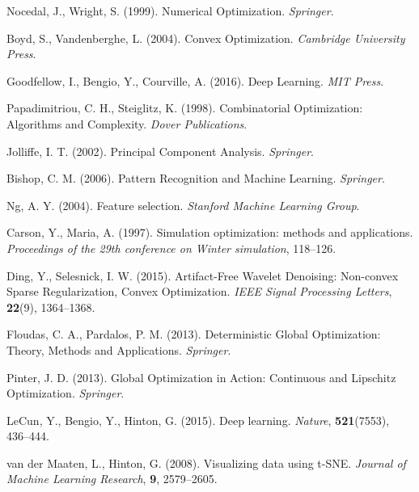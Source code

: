 \begin{itemize}
		\begin{thebibliography}{}
			
			Nocedal, J., Wright, S. (1999). Numerical Optimization.
			\textit{Springer}.
			
			Boyd, S., Vandenberghe, L. (2004). Convex Optimization.
			\textit{Cambridge University Press}.
			
			Goodfellow, I., Bengio, Y., Courville, A. (2016). Deep Learning.
			\textit{MIT Press}.
			
			Papadimitriou, C. H., Steiglitz, K. (1998). Combinatorial Optimization: Algorithms and Complexity.
			\textit{Dover Publications}.
			
			Jolliffe, I. T. (2002). Principal Component Analysis.
			\textit{Springer}.
			
			Bishop, C. M. (2006). Pattern Recognition and Machine Learning.
			\textit{Springer}.
			
			Ng, A. Y. (2004). Feature selection.
			\textit{Stanford Machine Learning Group}.
			
			Carson, Y., Maria, A. (1997). Simulation optimization: methods and applications.
			\textit{Proceedings of the 29th conference on Winter simulation}, 118--126.
			
			Ding, Y., Selesnick, I. W. (2015). Artifact-Free Wavelet Denoising: Non-convex Sparse Regularization, Convex Optimization.
			\textit{IEEE Signal Processing Letters}, \textbf{22}(9), 1364--1368.
			
			Floudas, C. A., Pardalos, P. M. (2013). Deterministic Global Optimization: Theory, Methods and Applications.
			\textit{Springer}.
			
			Pinter, J. D. (2013). Global Optimization in Action: Continuous and Lipschitz Optimization.
			\textit{Springer}.
			
			LeCun, Y., Bengio, Y., Hinton, G. (2015). Deep learning.
			\textit{Nature}, \textbf{521}(7553), 436--444.
			
			van der Maaten, L., Hinton, G. (2008). Visualizing data using t-SNE.
			\textit{Journal of Machine Learning Research}, \textbf{9}, 2579--2605.
			

\end{thebibliography}
\end{itemize}
